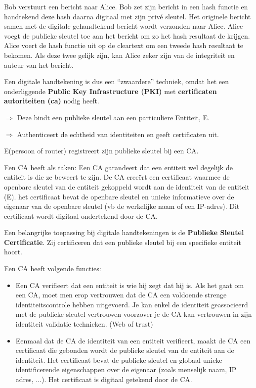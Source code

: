 \noindent Bob verstuurt een bericht naar Alice. Bob zet zijn bericht in een hash functie en handtekend deze hash daarna digitaal met zijn privé sleutel. Het originele bericht samen met de digitale gehandtekend bericht wordt verzonden naar Alice. Alice voegt de publieke sleutel toe aan het bericht om zo het hash resultaat de krijgen. Alice voert de hash functie uit op de cleartext om een tweede hash resultaat te bekomen. Als deze twee gelijk zijn, kan Alice zeker zijn van de integriteit en auteur van het bericht.

\noindent Een digitale handtekening is dus een “zwaardere” techniek, omdat het een onderliggende \textbf{Public Key Infrastructure (PKI)} met \textbf{ certificaten autoriteiten (\acrshort{ca})} nodig heeft.


\noindent $\Rightarrow$ Deze bindt een publieke sleutel aan een particuliere Entiteit, E.

\noindent $\Rightarrow$ Authenticeert de echtheid van identiteiten en geeft certificaten uit.

\noindent E(persoon of router) registreert zijn publieke sleutel bij een CA.

\noindent Een CA heeft als taken:
\bi
\itf Een CA garandeert dat een entiteit wel degelijk de entiteit is die ze beweert te zijn.
\itf De CA creeërt een certificaat waarmee de openbare sleutel van de entiteit gekoppeld wordt aan de identiteit van de entiteit (E).
    \bi
    \itf het certificaat bevat de openbare sleutel en unieke informatieve over de eigenaar van de openbare sleutel (vb de werkelijke naam of een IP-adres). Dit certificaat wordt digitaal ondertekend door de CA. 
    \ei
\ei

\newpage


Een belangrijke toepassing bij digitale handtekeningen is de \textbf{Publieke Sleutel Certificatie}. Zij certificeren dat een publieke sleutel bij een specifieke entiteit hoort.

\noindent Een CA heeft volgende functies:
\begin{itemize}
\item Een CA verifieert dat een entiteit is wie hij zegt dat hij is. Als het gaat om een CA, moet men erop vertrouwen dat de CA een voldoende strenge identiteitscontrole hebben uitgevoerd. Je kan enkel de identiteit geassocieerd met de publieke sleutel vertrouwen voorzover je de CA kan vertrouwen in zijn identiteit validatie technieken. (Web of trust)
\item Eenmaal dat de CA de identiteit van een entiteit verifieert, maakt de CA een certificaat die gebonden wordt de publieke sleutel van de entiteit aan de identiteit. Het certificaat bevat de publieke sleutel en globaal unieke identificerende eigenschappen over de eigenaar (zoals menselijk naam, IP adres, ...). Het certificaat is digitaal getekend door de CA.
\end{itemize}

